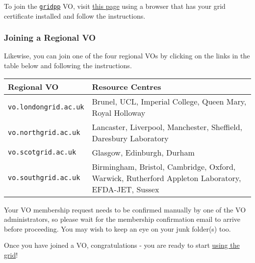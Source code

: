 \documentclass[]{article}
\begin{document}
To join the
\href{https://voms.gridpp.ac.uk:8443/voms/gridpp}{\texttt{gridpp}} VO,
visit
\href{https://voms.gridpp.ac.uk:8443/voms/gridpp/register/start.action}{this
page} using a browser that has your grid certificate installed and
follow the instructions.

\subsubsection{Joining a Regional VO}\label{joining-a-regional-vo}

Likewise, you can join one of the four regional VOs by clicking on the
links in the table below and following the instructions.

\begin{longtable}[c]{@{}ll@{}}
\toprule
\begin{minipage}[b]{0.05\columnwidth}\raggedright\strut
Regional VO
\strut\end{minipage} &
\begin{minipage}[b]{0.05\columnwidth}\raggedright\strut
Resource Centres
\strut\end{minipage}\tabularnewline
\midrule
\endhead
\begin{minipage}[t]{0.05\columnwidth}\raggedright\strut
\texttt{vo.londongrid.ac.uk}
\strut\end{minipage} &
\begin{minipage}[t]{0.05\columnwidth}\raggedright\strut
Brunel, UCL, Imperial College, Queen Mary, Royal Holloway
\strut\end{minipage}\tabularnewline
\begin{minipage}[t]{0.05\columnwidth}\raggedright\strut
\texttt{vo.northgrid.ac.uk}
\strut\end{minipage} &
\begin{minipage}[t]{0.05\columnwidth}\raggedright\strut
Lancaster, Liverpool, Manchester, Sheffield, Daresbury Laboratory
\strut\end{minipage}\tabularnewline
\begin{minipage}[t]{0.05\columnwidth}\raggedright\strut
\texttt{vo.scotgrid.ac.uk}
\strut\end{minipage} &
\begin{minipage}[t]{0.05\columnwidth}\raggedright\strut
Glasgow, Edinburgh, Durham
\strut\end{minipage}\tabularnewline
\begin{minipage}[t]{0.05\columnwidth}\raggedright\strut
\texttt{vo.southgrid.ac.uk}
\strut\end{minipage} &
\begin{minipage}[t]{0.05\columnwidth}\raggedright\strut
Birmingham, Bristol, Cambridge, Oxford, Warwick, Rutherford Appleton
Laboratory, EFDA-JET, Sussex
\strut\end{minipage}\tabularnewline
\bottomrule
\end{longtable}

Your VO membership request needs to be confirmed manually by one of the
VO administrators, so please wait for the membership confirmation email
to arrive before proceeding. You may wish to keep an eye on your junk
folder(s) too.

Once you have joined a VO, congratulations - you are ready to start
\href{dirac-first-steps.html}{using the grid}!
\end{document}
